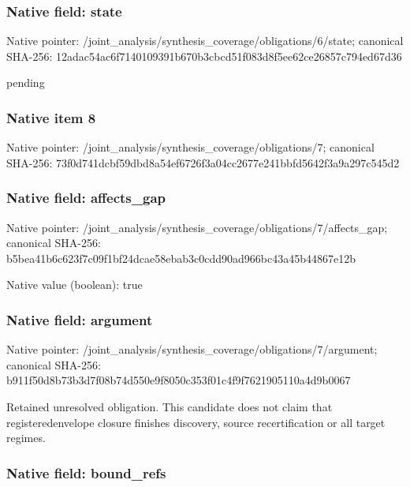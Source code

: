 \documentclass[10pt,a4paper]{article}
\begin{document}
\subsubsection{Native field: state}


Native pointer: /joint\_analysis/synthesi\allowbreak{}s\_coverage/obligations/6\allowbreak{}/state; canonical SHA-256: 12adac54ac6f7140109391b6\allowbreak{}70b3cbcd51f083d8f5ee62ce\allowbreak{}26857c794ed67d36


pending


\subsubsection{Native item 8}


Native pointer: /joint\_analysis/synthesi\allowbreak{}s\_coverage/obligations/7; canonical SHA-256: 73f0d741dcbf59dbd8a54ef6\allowbreak{}726f3a04cc2677e241bbfd56\allowbreak{}42f3a9a297c545d2



\subsubsection{Native field: affects\_gap}


Native pointer: /joint\_analysis/synthesi\allowbreak{}s\_coverage/obligations/7\allowbreak{}/affects\_gap; canonical SHA-256: b5bea41b6c623f7c09f1bf24\allowbreak{}dcae58ebab3c0cdd90ad966b\allowbreak{}c43a45b44867e12b



Native value (boolean): true



\subsubsection{Native field: argument}


Native pointer: /joint\_analysis/synthesi\allowbreak{}s\_coverage/obligations/7\allowbreak{}/argument; canonical SHA-256: b911f50d8b73b3d7f08b74d5\allowbreak{}50e9f8050c353f01c4f9f762\allowbreak{}1905110a4d9b0067


Retained unresolved obligation. This candidate does not claim that registeredenvelope closure finishes discovery, source recertification or all target regimes.


\subsubsection{Native field: bound\_refs}
\end{document}

